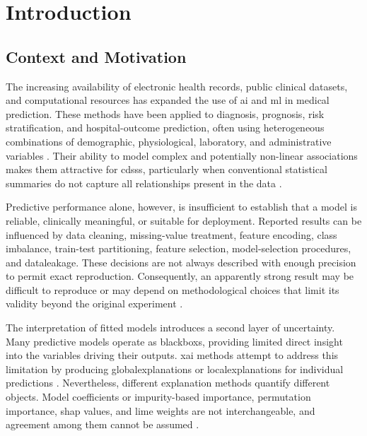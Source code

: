\chapter{Introduction}
\label{chap:introduction}

\glsresetall

\section{Context and Motivation}

The increasing availability of electronic health records, public clinical datasets, and computational resources has expanded the use of \gls{ai} and \gls{ml} in medical prediction. These methods have been applied to diagnosis, prognosis, risk stratification, and hospital-outcome prediction, often using heterogeneous combinations of demographic, physiological, laboratory, and administrative variables \citep{hassija_interpreting_2024, bharati_review_2024, ahmed_artificial_2022}. Their ability to model complex and potentially non-linear associations makes them attractive for \glspl{cdss}, particularly when conventional statistical summaries do not capture all relationships present in the data \citep{ahmed_artificial_2022, bharati_review_2024, tjoa_survey_2021}.

Predictive performance alone, however, is insufficient to establish that a model is reliable, clinically meaningful, or suitable for deployment. Reported results can be influenced by data cleaning, missing-value treatment, feature encoding, class imbalance, train-test partitioning, feature selection, model-selection procedures, and \gls{dataleakage}. These decisions are not always described with enough precision to permit exact reproduction. Consequently, an apparently strong result may be difficult to reproduce or may depend on methodological choices that limit its validity beyond the original experiment \citep{collins_tripodai_2024, moons_probastai_2025,van_calster_calibration_2019}.

The interpretation of fitted models introduces a second layer of uncertainty. Many predictive models operate as \glspl{blackbox}, providing limited direct insight into the variables driving their outputs. \Gls{xai} methods attempt to address this limitation by producing \glspl{globalexplanation} or \glspl{localexplanation} for individual predictions \citep{adadi_peeking_2018, barredo_arrieta_explainable_2020, linardatos_explainable_2020}. Nevertheless, different explanation methods quantify different objects. Model coefficients or impurity-based importance, permutation importance, \gls{shap} values, and \gls{lime} weights are not interchangeable, and agreement among them cannot be assumed \citep{NIPS2017_8a20a862, ribeiro_why_2016, vilone_classification_2021}.

